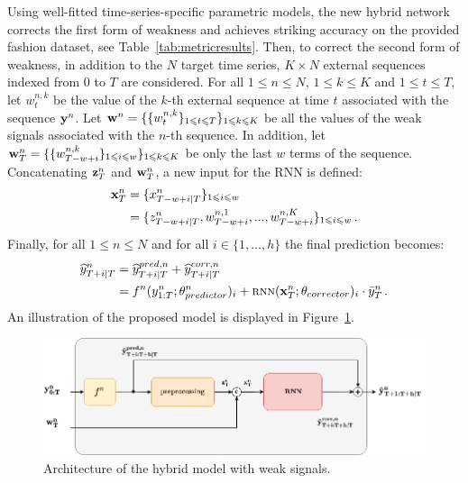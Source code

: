 \documentclass[lettersize,journal]{IEEEtran}
\newcommand{\ts}{y}
\newcommand{\fullts}{{\bf \ts}}
\newcommand{\tspred}{\widehat{\ts}}
\newcommand{\stat}{f}
\newcommand{\statparam}{\theta_{predictor}}
\newcommand{\lag}{h}
\newcommand{\window}{w}
\newcommand{\meants}{\Bar{\ts}}
\newcommand{\rnnwindow}{{\bf \rnninput}}
\newcommand{\rnninput}{z}
\newcommand{\rnn}{\textsc{rnn}}
\newcommand{\rnnparam}{\theta_{corrector}}
\newcommand{\rnnmodel}{\textsc{rnn}}
\newcommand{\ws}{w}
\newcommand{\fullws}{{\bf \ws}}
\newcommand{\concatinput}{x}
\newcommand{\fullconcatinput}{{ \bf \concatinput}}
\begin{document}
Using well-fitted time-series-specific parametric models, the new hybrid network corrects the first form of weakness and achieves striking accuracy on the provided fashion dataset, see Table~\ref{tab:metricresults}. Then, to correct the second form of weakness, in addition to the $N$ target time series, $K \times N$ external sequences indexed from $0$ to $T$ are considered. For all $1\leqslant n \leqslant N$, $1\leqslant k \leqslant K$ and  $1\leqslant t \leqslant T$, let $\ws^{n,k}_t$ be the value of the $k$-th external sequence at time $t$ associated with the sequence $\fullts^n$. Let  $\fullws^n = \{\{\ws_t^{n,k}\}_{1\leqslant t \leqslant T}\}_{1\leqslant k \leqslant K}$ be all the values of the weak signals associated with the $n$-th sequence. In addition, let $\fullws^n_T = \{\{\ws_{T-w+i}^{n,k}\}_{1\leqslant i \leqslant \window}\}_{1\leqslant k \leqslant K}$ be only the last $\window$ terms of the sequence. Concatenating $ \rnnwindow^n_T$ and $\fullws^n_T$, a new input for the RNN is defined:   
\begin{align*}
\fullconcatinput^n_T &= \{\concatinput^n_{T-w+i|T}\}_{1\leqslant i \leqslant w}\\
&= \{\rnninput^n_{T-w+i|T}, \ws^{n,1}_{T-w+i},...,\ws^{n,K}_{T-w+i}\}_{1\leqslant i \leqslant w}\,.
\end{align*}
Finally, for all $1\leqslant n \leqslant N$ and for all $i \in \{1,\ldots,\lag\}$ the final prediction becomes:
\begin{align}
\label{eq:withws:full:model}
\tspred^n_{T+i|T}  &= \tspred^{pred,n}_{T+i|T} +  \tspred^{corr,n}_{T+i|T}\\
& = \stat^n(\ts^n_{1:T};\statparam^n)_i +  \rnn(\fullconcatinput^n_T;\rnnparam)_i \cdot \meants^n_T\,.\nonumber
\end{align}
An illustration of the proposed  model is displayed in Figure~\ref{fig:architecture}.

\begin{figure}
  \centering
    \includegraphics[width=1\linewidth]{figure/HERMES_archi.png}
  \caption{Architecture of the hybrid model with weak signals.}
\label{fig:architecture}
\end{figure}
\end{document}
